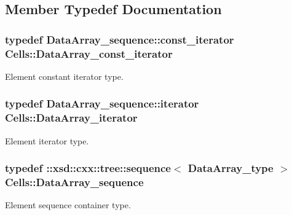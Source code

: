 \subsection{Member Typedef Documentation}
\hypertarget{classCells_ad01c81703074599471cd6159cdea1ac1}{}
\subsubsection[{Data\+Array\+\_\+const\+\_\+iterator}]{\setlength{\rightskip}{0pt plus 5cm}typedef Data\+Array\+\_\+sequence\+::const\+\_\+iterator {\bf Cells\+::\+Data\+Array\+\_\+const\+\_\+iterator}}\label{classCells_ad01c81703074599471cd6159cdea1ac1}


Element constant iterator type. 

\hypertarget{classCells_a1873efdee2bb668676d01a7a5010faa2}{}
\subsubsection[{Data\+Array\+\_\+iterator}]{\setlength{\rightskip}{0pt plus 5cm}typedef Data\+Array\+\_\+sequence\+::iterator {\bf Cells\+::\+Data\+Array\+\_\+iterator}}\label{classCells_a1873efdee2bb668676d01a7a5010faa2}


Element iterator type. 

\hypertarget{classCells_ae2856ec1cc2c6d6a2ccac9de9a22c7b7}{}
\subsubsection[{Data\+Array\+\_\+sequence}]{\setlength{\rightskip}{0pt plus 5cm}typedef \+::xsd\+::cxx\+::tree\+::sequence$<$ {\bf Data\+Array\+\_\+type} $>$ {\bf Cells\+::\+Data\+Array\+\_\+sequence}}\label{classCells_ae2856ec1cc2c6d6a2ccac9de9a22c7b7}


Element sequence container type. 

\hypertarget{classCells_ac35ecebe10914f3d35e85589e998462b}{}
